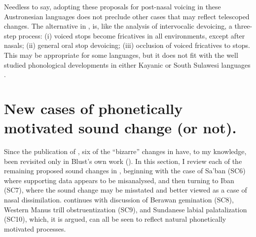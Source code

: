 \documentclass[output=paper]{langscibook}
\begin{document}
Needless to say, adopting these proposals for post-nasal voicing in these Austronesian languages does not preclude other cases that may reflect telescoped changes. The alternative in \citet{Beguš2019}, is, like the analysis of intervocalic devoicing, a three-step process: (i) voiced stops become fricatives in all environments, except after nasals; (ii) general oral stop devoicing; (iii) occlusion of voiced fricatives to stops. This may be appropriate for some languages, but it does not fit with the well studied phonological developments in either Kayanic \citep{Smith2017} or South Sulawesi languages \citep{Mills1975}.

\section{\label{sec:blevins:3}New cases of phonetically motivated sound change (or not).}
\largerpage
Since the publication of \citet{Blust2005}, six of the “bizarre” changes in  have, to my knowledge, been revisited only in Blust’s own work (\citealt{Blust2013,Blust2016, Blust2018}). In this section, I review each of the remaining proposed sound changes in , beginning with the case of Sa’ban (SC6) where supporting data appears to be misanalysed, and then turning to Iban (SC7), where the sound change may be misstated and better viewed as a case of nasal dissimilation.  continues with discussion of Berawan gemination (SC8), Western Manus trill obstruentization (SC9), and Sundanese labial palatalization (SC10), which, it is argued, can all be seen to reflect natural phonetically motivated processes.
\end{document}
